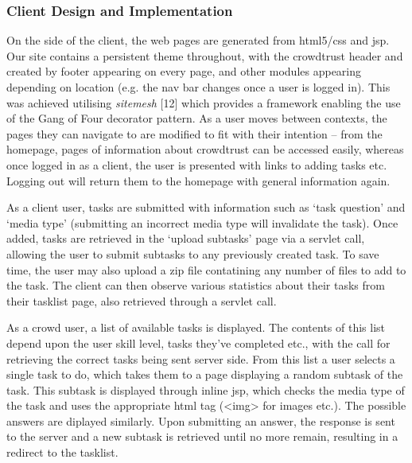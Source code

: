 \documentclass[11pt]{article}
\begin{document}
\subsubsection{Client Design and Implementation}
On the side of the client, the web pages are generated from html5/css and jsp. 
Our site contains a persistent theme throughout, with the crowdtrust header and
created by footer appearing on every page, and other modules appearing depending
on location (e.g. the nav bar changes once a user is logged in). This was achieved
utilising \emph{sitemesh} [12]
which provides a framework enabling the use of the Gang of Four decorator pattern.
As a user moves between contexts, the pages they can navigate to are modified
to fit with their intention -- from the homepage, pages of information about
crowdtrust can be accessed easily, whereas once logged in as a client, the user
is presented with links to adding tasks etc. Logging out will return them to
the homepage with general information again.

As a client user, tasks are submitted with information such as `task question'
and `media type' (submitting an incorrect media type will invalidate the task).
Once added, tasks are retrieved in the `upload subtasks' page via a servlet call,
allowing the user to submit subtasks to any previously created task. To save time,
the user may also upload a zip file contatining any number of files to add to the task.
The client can then observe various statistics about their tasks from their tasklist page,
also retrieved through a servlet call.

As a crowd user, a list of available tasks is displayed. The
contents of this list depend upon the user skill level, tasks they've completed
etc., with the call for retrieving the correct tasks being sent server side. From
this list a user selects a single task to do, which takes them to a page displaying
a random subtask of the task. This subtask is displayed through inline jsp, which
checks the media type of the task and uses the appropriate html tag (<img> for images etc.).
The possible answers are diplayed similarly. Upon submitting an answer, the response
is sent to the server and a new subtask is retrieved until no more remain, resulting
in a redirect to the tasklist.
\end{document}
